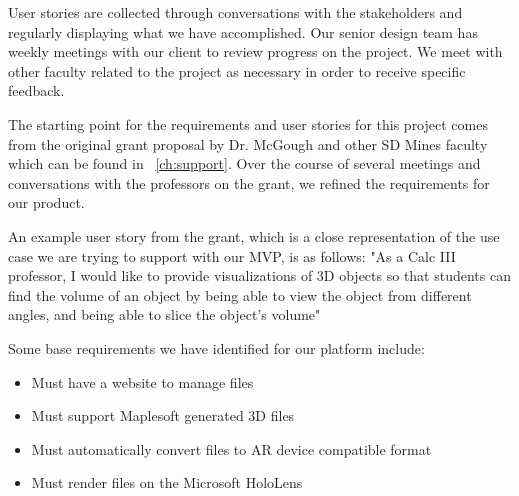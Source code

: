 
User stories are collected through conversations with the stakeholders and
regularly displaying what we have accomplished. Our senior design team has
weekly meetings with our client to review progress on the project. We meet
with other faculty related to the project as necessary in order to receive
specific feedback.

The starting point for the requirements and user stories for this project comes
from the original grant proposal by Dr. McGough and other SD Mines faculty
which can be found in ~\autoref{ch:support}. Over the course of several
meetings and conversations with the professors on the grant, we refined the
requirements for our product.

An example user story from the grant, which is a close representation of the
use case we are trying to support with our MVP, is as follows: "As a Calc III
professor, I would like to provide visualizations of 3D objects so that
students can find the volume of an object by being able to view the object
from different angles, and being able to slice the object's volume"

Some base requirements we have identified for our platform include:
\begin{itemize}
	\item Must have a website to manage files
	\item Must support Maplesoft generated 3D files
	\item Must automatically convert files to AR device compatible format
	\item Must render files on the Microsoft HoloLens
\end{itemize}




